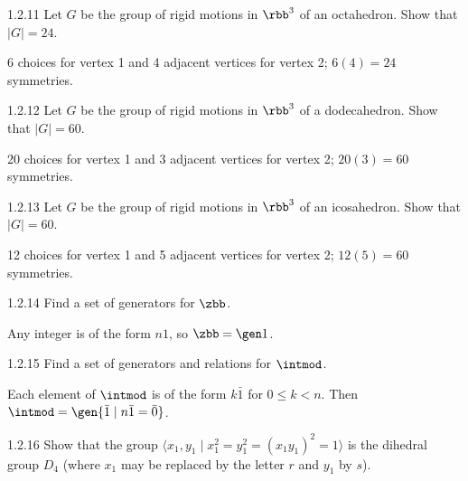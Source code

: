 \begin{exercise}{1.2.11}
    Let $G$ be the group of rigid motions in $\rbb^3$ of an octahedron.
	Show that $|G| = 24$.
\end{exercise}

\begin{sol}
    6 choices for vertex 1 and 4 adjacent vertices for vertex 2; $6(4) = 24$ symmetries.
\end{sol}

\begin{exercise}{1.2.12}
    Let $G$ be the group of rigid motions in $\rbb^3$ of a dodecahedron.
	Show that $|G| = 60$.
\end{exercise}

\begin{sol}
    20 choices for vertex 1 and 3 adjacent vertices for vertex 2; $20(3) = 60$ symmetries.
\end{sol}

\begin{exercise}{1.2.13}
    Let $G$ be the group of rigid motions in $\rbb^3$ of an icosahedron.
	Show that $|G| = 60$.
\end{exercise}

\begin{sol}
    12 choices for vertex 1 and 5 adjacent vertices for vertex 2; $12(5) = 60$ symmetries.
\end{sol}

\begin{exercise}{1.2.14}
    Find a set of generators for $\zbb$.
\end{exercise}

\begin{sol}
    Any integer is of the form $n1$, so $\zbb = \gen 1$.
\end{sol}

\begin{exercise}{1.2.15}
    Find a set of generators and relations for $\intmod$.
\end{exercise}

\begin{sol}
    Each element of $\intmod$ is of the form $k\bar 1$ for $0 \leq k < n$.
	Then $\intmod = \gen{\bar 1 \mid n\bar 1 = \bar 0}$.
\end{sol}

\begin{exercise}{1.2.16}
    Show that the group $\langle x_1, y_1 \mid x_1^2 = y_1^2 = (x_1 y_1)^2 = 1 \rangle$ is the dihedral group $D_4$ (where $x_1$ may be replaced by the letter $r$ and $y_1$ by $s$).

\end{exercise}

